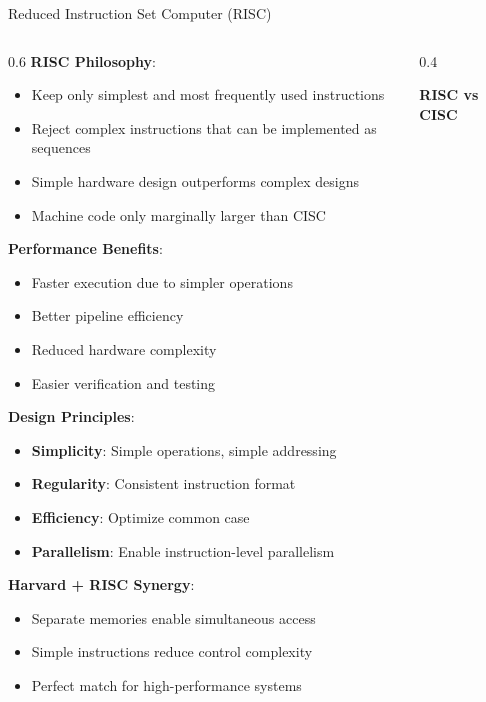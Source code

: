 \documentclass[aspectratio=169]{beamer}
\newcommand{\concept}[1]{\textbf{\color{darkblue}#1}}
\begin{document}
\begin{frame}{Reduced Instruction Set Computer (RISC)}
\begin{columns}
\begin{column}{0.6\textwidth}
\concept{RISC Philosophy}:
\begin{itemize}
\item Keep only simplest and most frequently used instructions
\item Reject complex instructions that can be implemented as sequences
\item Simple hardware design outperforms complex designs
\item Machine code only marginally larger than CISC
\end{itemize}

\vspace{0.3cm}
\concept{Performance Benefits}:
\begin{itemize}
\item Faster execution due to simpler operations
\item Better pipeline efficiency
\item Reduced hardware complexity
\item Easier verification and testing
\end{itemize}

\vspace{0.3cm}
\concept{Design Principles}:
\begin{itemize}
\item \textbf{Simplicity}: Simple operations, simple addressing
\item \textbf{Regularity}: Consistent instruction format
\item \textbf{Efficiency}: Optimize common case
\item \textbf{Parallelism}: Enable instruction-level parallelism
\end{itemize}

\vspace{0.3cm}
\concept{Harvard + RISC Synergy}:
\begin{itemize}
\item Separate memories enable simultaneous access
\item Simple instructions reduce control complexity
\item Perfect match for high-performance systems
\end{itemize}
\end{column}
\begin{column}{0.4\textwidth}
\begin{center}
\textbf{RISC vs CISC}
\vspace{0.3cm}


\end{center}
\end{column}
\end{columns}
\end{frame}
\end{document}
